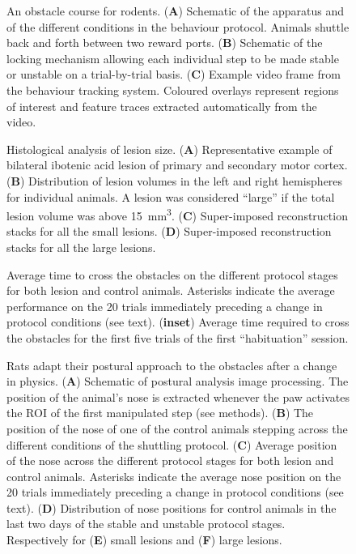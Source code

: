 
\begin{figure}
\centering

\caption{An obstacle course for rodents. (\textbf{A}) Schematic of the apparatus and of the different conditions in the behaviour protocol. Animals shuttle back and forth between two reward ports. (\textbf{B}) Schematic of the locking mechanism allowing each individual step to be made stable or unstable on a trial-by-trial basis. (\textbf{C}) Example video frame from the behaviour tracking system. Coloured overlays represent regions of interest and feature traces extracted automatically from the video. }
\label{fig:assay}
\end{figure}

\begin{figure}
\centering

\caption{Histological analysis of lesion size. (\textbf{A}) Representative example of bilateral ibotenic acid lesion of primary and secondary motor cortex. (\textbf{B}) Distribution of lesion volumes in the left and right hemispheres for individual animals. A lesion was considered ``large'' if the total lesion volume was above \SI{15}{\milli\meter\cubed}. (\textbf{C}) Super-imposed reconstruction stacks for all the small lesions. (\textbf{D}) Super-imposed reconstruction stacks for all the large lesions.}
\label{fig:histology}
\end{figure}

\begin{figure}
\centering

\caption{Average time to cross the obstacles on the different protocol stages for both lesion and control animals. Asterisks indicate the average performance on the 20 trials immediately preceding a change in protocol conditions (see text). (\textbf{inset}) Average time required to cross the obstacles for the first five trials of the first ``habituation'' session.}
\label{fig:learning}
\end{figure}

\begin{figure}
\centering

\caption{Rats adapt their postural approach to the obstacles after a change in physics. (\textbf{A}) Schematic of postural analysis image processing. The position of the animal's nose is extracted whenever the paw activates the ROI of the first manipulated step (see methods). (\textbf{B}) The position of the nose of one of the control animals stepping across the different conditions of the shuttling protocol. (\textbf{C}) Average position of the nose across the different protocol stages for both lesion and control animals. Asterisks indicate the average nose position on the 20 trials immediately preceding a change in protocol conditions (see text). (\textbf{D}) Distribution of nose positions for control animals in the last two days of the stable and unstable protocol stages. Respectively for (\textbf{E}) small lesions and (\textbf{F}) large lesions.}
\label{fig:posture}
\end{figure}

